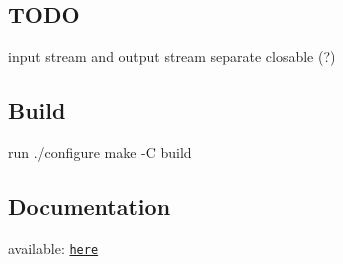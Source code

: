 \subsection*{T\+O\+DO}


\begin{DoxyItemize}
\item input stream and output stream separate closable (?)
\end{DoxyItemize}

\subsection*{Build}

run ./configure make -\/C build

\subsection*{Documentation}

available\+: \href{https://devfix.github.io/cpplibs/html/index.html}{\tt here} 